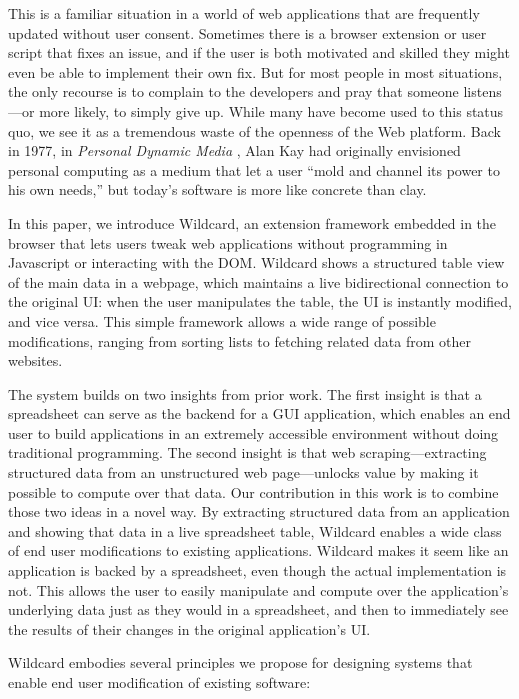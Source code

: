 \documentclass[english,submission]{programming}
\begin{document}
This is a familiar situation in a world of web applications that are
frequently updated without user consent. Sometimes there is a browser
extension or user script that fixes an issue, and if the user is both
motivated and skilled they might even be able to implement their own
fix. But for most people in most situations, the only recourse is to
complain to the developers and pray that someone listens---or more
likely, to simply give up. While many have become used to this status
quo, we see it as a tremendous waste of the openness of the Web
platform. Back in 1977, in \emph{Personal Dynamic Media}
\autocite{kay1977}, Alan Kay had originally envisioned personal
computing as a medium that let a user ``mold and channel its power to
his own needs,'' but today's software is more like concrete than clay.

In this paper, we introduce Wildcard, an extension framework embedded in
the browser that lets users tweak web applications without programming
in Javascript or interacting with the DOM. Wildcard shows a structured
table view of the main data in a webpage, which maintains a live
bidirectional connection to the original UI: when the user manipulates
the table, the UI is instantly modified, and vice versa. This simple
framework allows a wide range of possible modifications, ranging from
sorting lists to fetching related data from other websites.

The system builds on two insights from prior work. The first insight is
that a spreadsheet can serve as the backend for a GUI application, which
enables an end user to build applications in an extremely accessible
environment without doing traditional programming. The second insight is
that web scraping---extracting structured data from an unstructured web
page---unlocks value by making it possible to compute over that data.
Our contribution in this work is to combine those two ideas in a novel
way. By extracting structured data from an application and showing that
data in a live spreadsheet table, Wildcard enables a wide class of end
user modifications to existing applications. Wildcard makes it seem like
an application is backed by a spreadsheet, even though the actual
implementation is not. This allows the user to easily manipulate and
compute over the application's underlying data just as they would in a
spreadsheet, and then to immediately see the results of their changes in
the original application's UI.

Wildcard embodies several principles we propose for designing systems
that enable end user modification of existing software:
\end{document}
